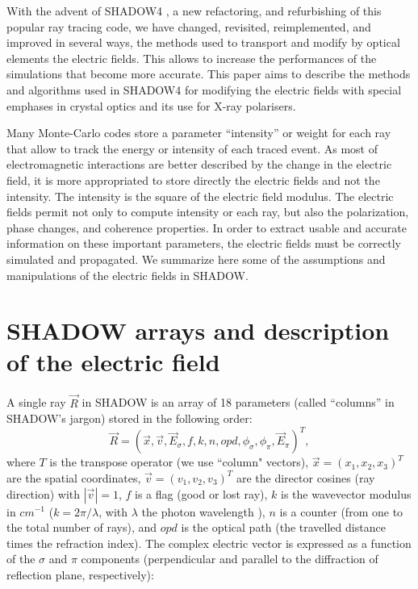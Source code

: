 \documentclass{iucr}
\begin{document}
With the advent of SHADOW4 \cite{ShadowSRN2023}, a new refactoring, and refurbishing of this popular ray tracing code, we have changed, revisited, reimplemented, and improved in several ways, the methods used to transport and modify by optical elements the electric fields. This allows to increase the performances of the simulations that become more accurate.
This paper aims to describe the methods and algorithms used in SHADOW4 for modifying the electric fields with special emphases in crystal optics and its use for X-ray polarisers.   

Many Monte-Carlo codes store a parameter ``intensity'' or weight for each ray that allow to track the energy or intensity of each traced event.
As most of electromagnetic interactions are better described by the change in the electric field, it is more appropriated to store directly the electric fields and not the intensity. 
The intensity is the square of the electric field modulus.
The electric fields permit not only to compute intensity or each ray, but also the polarization, phase changes, and coherence properties.
In order to extract usable and accurate information on these important parameters, the electric fields must be correctly simulated and propagated.
We summarize here some of the assumptions and manipulations of the electric fields in SHADOW. 



\section{SHADOW arrays and description of the electric field}\label{sec:definitions}

A single ray $\vec{R}$ in SHADOW is an array of 18 parameters (called ``columns'' in SHADOW's jargon) stored in the following order:
\begin{equation}
   \vec{R}=( \vec{x},\vec{v},\vec{E}_\sigma,f,k,n,opd,\phi_\sigma,\phi_\pi,\vec{E}_\pi)^T,
\end{equation}
where $T$ is the transpose operator (we use ``column" vectors), $\vec{x}=(x_1,x_2,x_3)^T$ are the spatial coordinates, $\vec{v}=(v_1,v_2,v_3)^T$ are the director cosines (ray direction) with $|\vec{v}|=1$, $f$ is a flag (good or lost ray), $k$ is the wavevector modulus in $cm^{-1}$ ($k=2\pi / \lambda$, with $\lambda$ the photon wavelength ), $n$ is a counter (from one to the total number of rays), and $opd$ is the optical path (the travelled distance times the refraction index).
The complex electric vector is expressed as a function of the $\sigma$ and $\pi$ components (perpendicular and parallel to the diffraction of reflection plane, respectively):
\end{document}

